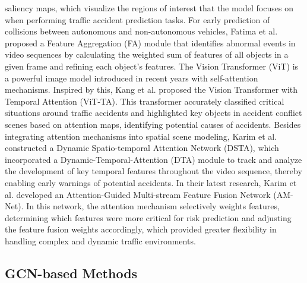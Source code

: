 saliency maps, which visualize the regions of interest that the model focuses on when performing traffic accident prediction tasks. For early prediction of collisions between autonomous and non-autonomous vehicles, Fatima et al. \cite{fatima2021global} proposed a Feature Aggregation (FA) module that identifies abnormal events in video sequences by calculating the weighted sum of features of all objects in a given frame and refining each object's features. The Vision Transformer \cite{dosovitskiy2020image} (ViT) is a powerful image model introduced in recent years with self-attention mechanisms. Inspired by this, Kang et al. \cite{kang2022vision} proposed the Vision Transformer with Temporal Attention (ViT-TA). This transformer accurately classified critical situations around traffic accidents and highlighted key objects in accident conflict scenes based on attention maps, identifying potential causes of accidents. Besides integrating attention mechanisms into spatial scene modeling, Karim et al. \cite{karim2022dynamic} constructed a Dynamic Spatio-temporal Attention Network (DSTA), which incorporated a Dynamic-Temporal-Attention (DTA) module to track and analyze the development of key temporal features throughout the video sequence, thereby enabling early warnings of potential accidents. In their latest research, Karim et al. \cite{karim2023attention} developed an Attention-Guided Multi-stream Feature Fusion Network (AM-Net). In this network, the attention mechanism selectively weights features, determining which features were more critical for risk prediction and adjusting the feature fusion weights accordingly, which provided greater flexibility in handling complex and dynamic traffic environments.

\subsection{GCN-based Methods}

